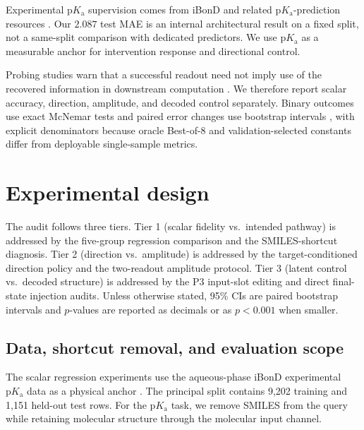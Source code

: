 \documentclass[11pt]{article}
\newcommand{\pka}{\mathrm{p}K_{\mathrm a}}
\begin{document}
Experimental $\pka$ supervision comes from iBonD and related $\pka$-prediction resources \citep{YangIbonD,Wang2026iBonD,Yang2020HolisticPKa,Pan2021MolGpKa,Luo2024UniPKa,Wang2026PkaAugmentation}. Our $2.087$ test MAE is an internal architectural result on a fixed split, not a same-split comparison with dedicated predictors. We use $\pka$ as a measurable anchor for intervention response and directional control.

Probing studies warn that a successful readout need not imply use of the recovered information in downstream computation \citep{Belinkov2022Probing}. We therefore report scalar accuracy, direction, amplitude, and decoded control separately. Binary outcomes use exact McNemar tests and paired error changes use bootstrap intervals \citep{McNemar1947,Efron1979Bootstrap}, with explicit denominators because oracle Best-of-8 and validation-selected constants differ from deployable single-sample metrics.

\section{Experimental design}
\label{sec:methods}

The audit follows three tiers. Tier 1 (scalar fidelity vs.\ intended pathway) is addressed by the five-group regression comparison and the SMILES-shortcut diagnosis. Tier 2 (direction vs.\ amplitude) is addressed by the target-conditioned direction policy and the two-readout amplitude protocol. Tier 3 (latent control vs.\ decoded structure) is addressed by the P3 input-slot editing and direct final-state injection audits. Unless otherwise stated, 95\% CIs are paired bootstrap intervals and $p$-values are reported as decimals or as $p<0.001$ when smaller.

\subsection{Data, shortcut removal, and evaluation scope}
\label{sec:data_shortcut}

The scalar regression experiments use the aqueous-phase iBonD experimental $\pka$ data as a physical anchor \citep{YangIbonD,Wang2026iBonD}. The principal split contains 9{,}202 training and 1{,}151 held-out test rows. For the $\pka$ task, we remove SMILES from the query while retaining molecular structure through the molecular input channel.
\end{document}
